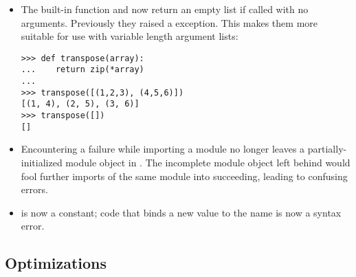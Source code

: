 \documentclass{howto}
\begin{document}
\begin{itemize}
\item The  built-in function and 
  now return an empty list if called with no arguments.
  Previously they raised a 
  exception.  This makes them more
  suitable for use with variable length argument lists:

\begin{verbatim}
>>> def transpose(array):
...    return zip(*array)
...
>>> transpose([(1,2,3), (4,5,6)])
[(1, 4), (2, 5), (3, 6)]
>>> transpose([])
[]
\end{verbatim}

\item Encountering a failure while importing a module no longer leaves
a partially-initialized module object in .  The
incomplete module object left behind would fool further imports of the
same module into succeeding, leading to confusing errors.  

\item {} is now a constant; code that binds a new value to 
the name  is now a syntax error.

\end{itemize}


\subsection{Optimizations}
\end{document}
